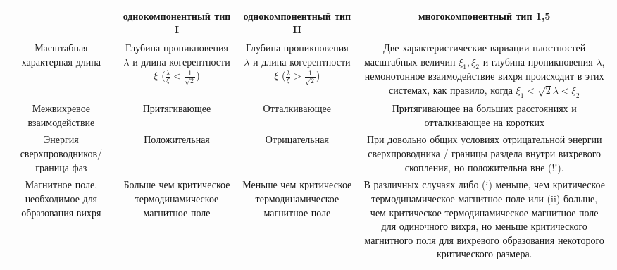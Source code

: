 \begin{table}[ht]
    \centering
    \begin{tabular}{|C{.18}|C{.22}|C{.22}|C{.35}|}
        \hline
        & однокомпонентный тип I & однокомпонентный тип II & 
        многокомпонентный тип 1,5 \\ \hline

        Масштабная характерная длина & Глубина проникновения \( \lambda \) и 
            длина когерентности \( \xi \) 
            (\( \frac{\lambda}{\xi} < \frac{1}{\sqrt{2}} \)) &
        Глубина проникновения \( \lambda \) и 
            длина когерентности \( \xi \) 
            (\( \frac{\lambda}{\xi} > \frac{1}{\sqrt{2}} \)) &
        Две характеристические вариации плостностей масштабных величин 
            \( \xi_1, \xi_2 \) и глубина проникновения \( \lambda \), 
            немонотонное взаимодействие вихря происходит в этих системах, как 
            правило, когда \( \xi_1 < \sqrt{2}\lambda < \xi_2 \) \\ \hline

        Межвихревое взаимодействие & Притягивающее & Отталкивающее & 
            Притягивающее на больших расстояниях и отталкивающее на коротких 
        \\ \hline

        Энергия сверхпроводников/граница фаз & Положительная & Отрицательная &
            При довольно общих условиях отрицательной энергии сверхпроводника / 
            границы раздела внутри вихревого скопления, но положительна вне (!!).

        \\ \hline

        Магнитное поле, необходимое для образования вихря & Больше чем 
            критическое термодинамическое магнитное поле & Меньше чем 
            критическое термодинамическое магнитное поле &
        В различных случаях либо (i) меньше, чем критическое термодинамическое 
            магнитное поле или (ii) больше, чем критическое термодинамическое
            магнитное поле для одиночного вихря, но меньше критического 
            магнитного поля для вихревого образования некоторого критического 
            размера.

        \\ \hline


\end{tabular}
\end{table}
